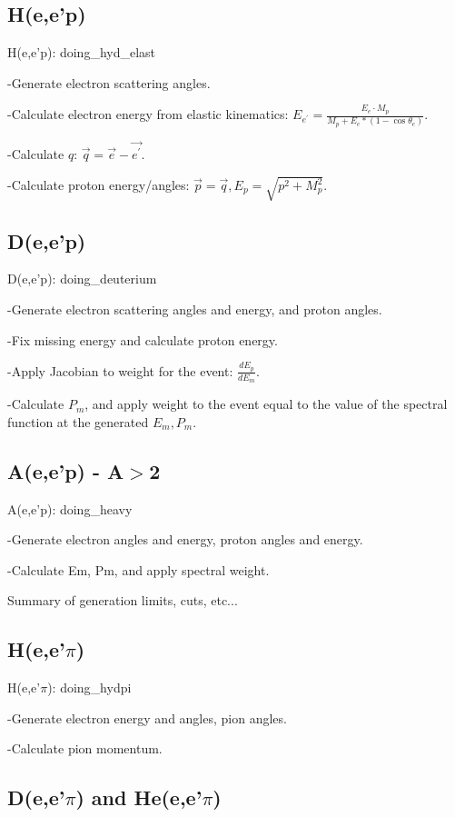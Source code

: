\subsection{H(e,e'p)}

H(e,e'p): doing\_hyd\_elast

-Generate electron scattering angles.

-Calculate electron energy from elastic kinematics: $E_{e^\prime} =
\frac{E_e \cdot M_p}{M_p + E_e*(1-\cos{\theta_e})}$.

-Calculate $q$: $\vec{q} = \vec{e}-\vec{e^\prime}$.

-Calculate proton energy/angles: $\vec{p} = \vec{q}, E_p=\sqrt{p^2+M_p^2}$.

\subsection{D(e,e'p)}

D(e,e'p): doing\_deuterium

-Generate electron scattering angles and energy, and proton angles.

-Fix missing energy and calculate proton energy.

-Apply Jacobian to weight for the event: $\frac{dE_p}{dE_m}$.

-Calculate $P_m$, and apply weight to the event equal to the value of the
spectral function at the generated $E_m, P_m$.

\subsection{A(e,e'p) - A$>$2}

A(e,e'p): doing\_heavy

-Generate electron angles and energy, proton angles and energy.

-Calculate Em, Pm, and apply spectral weight.

Summary of generation limits, cuts, etc...

\subsection{H(e,e'$\pi$)}

H(e,e'$\pi$): doing\_hydpi

-Generate electron energy and angles, pion angles.

-Calculate pion momentum.

\subsection{D(e,e'$\pi$) and He(e,e'$\pi$)}

